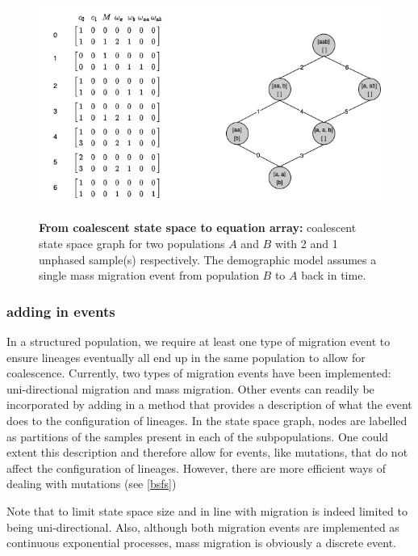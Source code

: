\documentclass[10pt, a4]{article}
\begin{document}
\begin{figure}
\begin{center}
\includegraphics[scale=0.5]{figures/temp2b.png} \label{fig:graph}
\end{center}
\caption{\textbf{From coalescent state space to equation array:} coalescent state space graph for two populations $A$ and $B$ with 2 and 1 unphased sample(s) respectively. The demographic model assumes a single mass migration event from population $B$ to $A$ back in time.}
\end{figure}

\subsubsection{adding in events}

In a structured population, we require at least one type of migration event to ensure lineages eventually all end up in the same population to allow for coalescence. Currently, two types of migration events have been implemented: uni-directional migration and mass migration. Other events can readily be incorporated by adding in a method that provides a description of what the event does to the configuration of lineages. In the state space graph, nodes are labelled as partitions of the samples present in each of the subpopulations. One could extent this description and therefore allow for events, like mutations, that do not affect the configuration of lineages. However, there are more efficient ways of dealing with mutations (see \ref{bsfs})

Note that to limit state space size and in line with \citet{Lohse2016} migration is indeed limited to being uni-directional. Also, although both migration events are implemented as continuous exponential processes, mass migration is obviously a discrete event.
\end{document}
